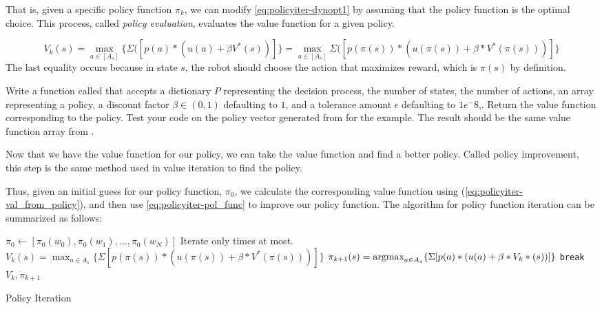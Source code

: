 That is, given a specific policy function $\pi_k$, we can modify \eqref{eq:policyiter-dynopt1} by assuming that the policy function is the optimal choice.
This process, called \emph{policy evaluation}, evaluates the value function for a given policy.

\begin{equation}
\label{eq:policyiter-val_from_policy}
V_k(s) = \max_{a \in [A_s]} \{\Sigma([p(a)*(u(a) + \beta V^*(s))]\} = \max_{a \in [A_s]} \Sigma([p(\pi(s))*(u(\pi(s)) + \beta *V^*(\pi(s)))]\}
\end{equation}
The last equality occurs because in state $s$, the robot should choose the action that maximizes reward, which is $\pi(s)$ by definition.


\begin{problem}
\label{prob:policyiter-value3}
Write a function called  that accepts a dictionary $P$ representing the decision process, the number of states, the number of actions, an array representing a policy, a discount factor $\beta \in (0,1)$ defaulting to $1$, and a tolerance amount $\epsilon$ defaulting to $1e^-8$,.
Return the value function corresponding to the policy.
Test your code on the policy vector generated from  for the example.
The result should be the same value function array from .
\end{problem}

Now that we have the value function for our policy, we can take the value function and find a better policy.
Called policy improvement, this step is the same method used in value iteration to find the policy.

Thus, given an initial guess for our policy function, $\pi_0$, we calculate the corresponding value function using (\ref{eq:policyiter-val_from_policy}), and then use \eqref{eq:policyiter-pol_func} to improve our policy function.
The algorithm for policy function iteration can be summarized as follows:


\begin{algorithm}[H]
\begin{algorithmic}[1]
    \State $\pi_0 \gets [\pi_0(w_0),\pi_0(w_1),\ldots,\pi_0(w_N)] $
        \Comment Iterate only  times at most.
            \State $V_{k}(s) = \max_{a \in A_s} \{\Sigma[p(\pi(s))*(u(\pi(s)) + \beta*V^*(\pi(s)))]\}$
        \EndFor
            \State $\pi_{k+1}(s) =\mbox{argmax}_{a \in A_s} \{\Sigma[p(a)*(u(a) + \beta*V_k*(s))]\}$
        \EndFor
            \State \texttt{break}
        \EndIf
    \EndFor
    \State {} $V_k, \pi_{k+1}$
\EndProcedure
\end{algorithmic}
\caption{Policy Iteration}
\label{alg:PolicyIteration}
\end{algorithm}


